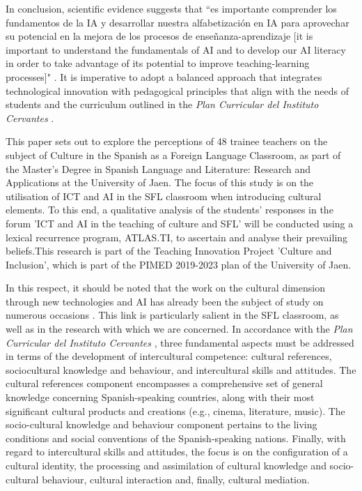 \documentclass[english]{textolivre}
\begin{document}
In conclusion, scientific evidence suggests that ``es importante comprender los fundamentos de la IA y desarrollar nuestra alfabetización en IA para aprovechar su potencial en la mejora de los procesos de enseñanza-aprendizaje [it is important to understand the fundamentals of AI and to develop our AI literacy in order to take advantage of its potential to improve teaching-learning processes]" \cite[p. 114]{arroyo2024}. It is imperative to adopt a balanced approach that integrates technological innovation with pedagogical principles that align with the needs of students and the curriculum outlined in the \textit{Plan Curricular del Instituto Cervantes} \citeyear{cervantes2006}.

This paper sets out to explore the perceptions of 48 trainee teachers on the subject of Culture in the Spanish as a Foreign Language Classroom, as part of the Master's Degree in Spanish Language and Literature: Research and Applications at the University of Jaen. The focus of this study is on the utilisation of ICT and AI in the SFL classroom when introducing cultural elements. To this end, a qualitative analysis of the students' responses in the forum 'ICT and AI in the teaching of culture and SFL' will be conducted using a lexical recurrence program, ATLAS.TI, to ascertain and analyse their prevailing beliefs.This research is part of the Teaching Innovation Project 'Culture and Inclusion', which is part of the PIMED 2019-2023 plan of the University of Jaen.

In this respect, it should be noted that the work on the cultural dimension through new technologies and AI has already been the subject of study on numerous occasions \cite{rodriguezizquierdo2015competencias, leiva2022, briceno2024}. This link is particularly salient in the SFL classroom, as well as in the research with which we are concerned. In accordance with the \textit{Plan Curricular del Instituto Cervantes} \cite{cervantes2006}, three fundamental aspects must be addressed in terms of the development of intercultural competence: cultural references, sociocultural knowledge and behaviour, and intercultural skills and attitudes. The cultural references component encompasses a comprehensive set of general knowledge concerning Spanish-speaking countries, along with their most significant cultural products and creations (e.g., cinema, literature, music). The socio-cultural knowledge and behaviour component pertains to the living conditions and social conventions of the Spanish-speaking nations. Finally, with regard to intercultural skills and attitudes, the focus is on the configuration of a cultural identity, the processing and assimilation of cultural knowledge and socio-cultural behaviour, cultural interaction and, finally, cultural mediation.
\end{document}
